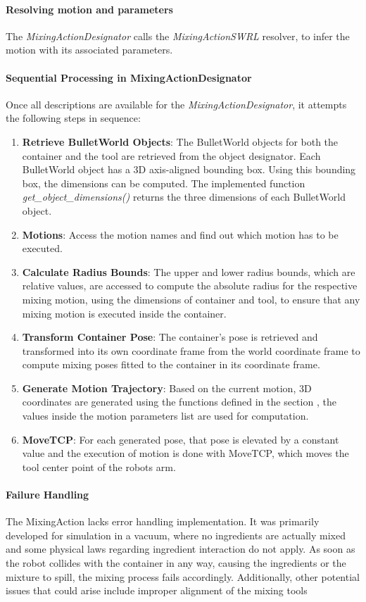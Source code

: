 \paragraph*{Resolving motion and parameters}
The \textit{MixingActionDesignator} calls the \textit{MixingActionSWRL} resolver, to infer the motion with its 
associated parameters. 

\paragraph*{Sequential Processing in MixingActionDesignator}
Once all descriptions are available for the \textit{MixingActionDesignator}, it attempts the following steps in sequence:

\begin{enumerate}
    \item \textbf{Retrieve BulletWorld Objects}: The BulletWorld objects for both the container and the tool are retrieved from the object designator. 
    Each BulletWorld object has a 3D axis-aligned bounding box. Using this bounding box, the dimensions can be computed. 
    The implemented function \textit{get\_object\_dimensions()} returns the three dimensions of each BulletWorld object.
    \item \textbf{Motions}: Access the motion names and find out which motion has to be executed.
    \item \textbf{Calculate Radius Bounds}: The upper and lower radius bounds, which are relative values, 
    are accessed to compute the absolute radius for the respective mixing motion, using the dimensions of container and tool, to ensure
    that any mixing motion is executed inside the container.
    \item \textbf{Transform Container Pose}: The container's pose is retrieved and transformed into its own coordinate frame from the world coordinate frame to 
    compute mixing poses fitted to the container in its coordinate frame.
    \item \textbf{Generate Motion Trajectory}: Based on the current motion, 3D coordinates are generated using the functions defined in the section ,
    the values inside the motion parameters list are used for computation.
    \item \textbf{MoveTCP}: For each generated pose, that pose is elevated by a constant value and the execution of motion is done with MoveTCP, which 
    moves the tool center point of the robots arm.
    
\end{enumerate}
\paragraph*{Failure Handling}
The MixingAction lacks error handling implementation. It was primarily developed for simulation in a vacuum, where no ingredients are actually mixed
and some physical laws regarding ingredient interaction do not apply. As soon as the robot collides with the container in any way, 
causing the ingredients or the mixture to spill, 
the mixing process fails accordingly. Additionally, other potential issues that could arise include improper alignment of the mixing tools
